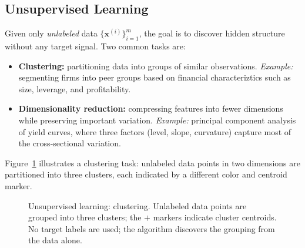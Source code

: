 \documentclass[11pt,a4paper]{report}
\newcommand{\x}{\bm{x}}
\begin{document}
\subsection{Unsupervised Learning}

Given only \emph{unlabeled} data $\{\x^{(i)}\}_{i=1}^{m}$, the goal is to discover hidden structure without any target signal.  Two common tasks are:
\begin{itemize}\itemsep2pt
    \item \textbf{Clustering:} partitioning data into groups of similar observations.  \emph{Example:} segmenting firms into peer groups based on financial characteriztics such as size, leverage, and profitability.
    \item \textbf{Dimensionality reduction:} compressing features into fewer dimensions while preserving important variation.  \emph{Example:} principal component analysis of yield curves, where three factors (level, slope, curvature) capture most of the cross-sectional variation.
\end{itemize}

\noindent Figure~\ref{fig:clustering} illustrates a clustering task: unlabeled data points in two dimensions are partitioned into three clusters, each indicated by a different color and centroid marker.

\begin{figure}[ht]
\centering
{}
\caption{Unsupervised learning: clustering.  Unlabeled data points are grouped into three clusters; the $+$ markers indicate cluster centroids.  No target labels are used; the algorithm discovers the grouping from the data alone.}
\label{fig:clustering}
\end{figure}
\end{document}
